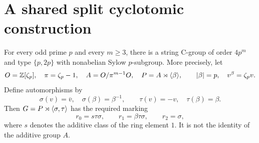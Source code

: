 \section{A shared split cyclotomic construction}
\begin{theorem}\label{UF.SplitConstruction}
For every odd prime $p$ and every $m\geq3$, there is a string
C-group of order $4p^m$ and type $\{p,2p\}$ with nonabelian
Sylow $p$-subgroup. More precisely, let
\[
 O=\mathbb Z[\zeta_p],\quad \pi=\zeta_p-1,\quad
 A=O/\pi^{m-1}O,\quad P=A\rtimes\langle \beta\rangle,
 \qquad |\beta|=p,\quad v^\beta=\zeta_pv.
\]
Define automorphisms by
\[
 \sigma(v)=\overline v,\quad\sigma(\beta)=\beta^{-1},
 \qquad\tau(v)=-v,\quad\tau(\beta)=\beta.
\]
Then $G=P\rtimes\langle \sigma,\tau\rangle$ has the required marking
\[
 r_0=s\tau\sigma,\qquad r_1=\beta\tau\sigma,\qquad r_2=\sigma,
\]
where $s$ denotes the additive class of the ring element $1$.
It is not the identity of the additive group $A$.
\end{theorem}
